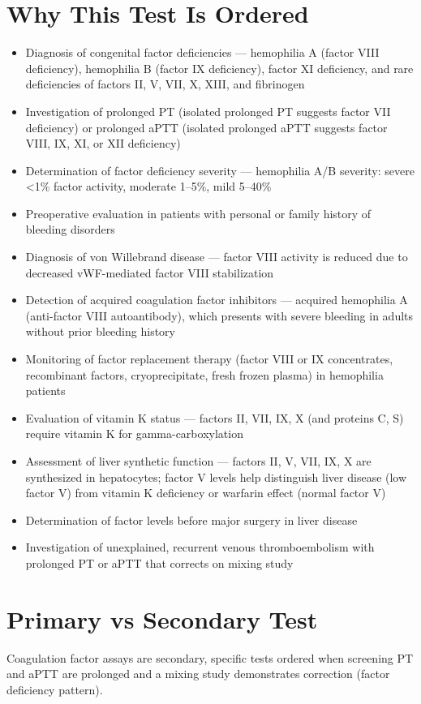 \section*{Why This Test Is Ordered}
\begin{itemize}
  \item Diagnosis of congenital factor deficiencies --- hemophilia A (factor VIII deficiency), hemophilia B (factor IX deficiency), factor XI deficiency, and rare deficiencies of factors II, V, VII, X, XIII, and fibrinogen
  \item Investigation of prolonged PT (isolated prolonged PT suggests factor VII deficiency) or prolonged aPTT (isolated prolonged aPTT suggests factor VIII, IX, XI, or XII deficiency)
  \item Determination of factor deficiency severity --- hemophilia A/B severity: severe <1\% factor activity, moderate 1--5\%, mild 5--40\%
  \item Preoperative evaluation in patients with personal or family history of bleeding disorders
  \item Diagnosis of von Willebrand disease --- factor VIII activity is reduced due to decreased vWF-mediated factor VIII stabilization
  \item Detection of acquired coagulation factor inhibitors --- acquired hemophilia A (anti-factor VIII autoantibody), which presents with severe bleeding in adults without prior bleeding history
  \item Monitoring of factor replacement therapy (factor VIII or IX concentrates, recombinant factors, cryoprecipitate, fresh frozen plasma) in hemophilia patients
  \item Evaluation of vitamin K status --- factors II, VII, IX, X (and proteins C, S) require vitamin K for gamma-carboxylation
  \item Assessment of liver synthetic function --- factors II, V, VII, IX, X are synthesized in hepatocytes; factor V levels help distinguish liver disease (low factor V) from vitamin K deficiency or warfarin effect (normal factor V)
  \item Determination of factor levels before major surgery in liver disease
  \item Investigation of unexplained, recurrent venous thromboembolism with prolonged PT or aPTT that corrects on mixing study
\end{itemize}

\section*{Primary vs Secondary Test}
Coagulation factor assays are secondary, specific tests ordered when screening PT and aPTT are prolonged and a mixing study demonstrates correction (factor deficiency pattern).

